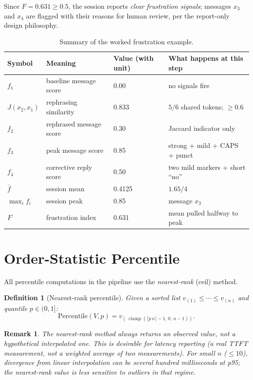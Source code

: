 \documentclass[11pt,a4paper]{article}
\newtheorem{definition}{Definition}
\newtheorem{remark}{Remark}
\newcommand{\clamp}[3]{\operatorname{clamp}\!\left(#1,\,#2,\,#3\right)}
\begin{document}
Since $F = 0.631 \geq 0.5$, the session reports \emph{clear frustration
signals}; messages $x_3$ and $x_4$ are flagged with their reasons for
human review, per the report-only design philosophy.

\begin{table}[h!]
\centering
\caption{Summary of the worked frustration example.}
\label{tab:frustration-worked}
\begin{tabular}{@{}llll@{}}
\toprule
Symbol & Meaning & Value (with unit) & What happens at this step \\
\midrule
$f_1$ & baseline message score & 0.00 & no signals fire \\
$J(x_2, x_1)$ & rephrasing similarity & 0.833 & $5/6$ shared tokens; $\geq 0.6$ \\
$f_2$ & rephrased message score & 0.30 & Jaccard indicator only \\
$f_3$ & peak message score & 0.85 & strong + mild + CAPS + punct \\
$f_4$ & corrective reply score & 0.50 & two mild markers + short ``no'' \\
$\bar{f}$ & session mean & 0.4125 & $1.65 / 4$ \\
$\max_i f_i$ & session peak & 0.85 & message $x_3$ \\
$F$ & frustration index & 0.631 & mean pulled halfway to peak \\
\bottomrule
\end{tabular}
\end{table}

\section{Order-Statistic Percentile}
\label{sec:percentile}

All percentile computations in the pipeline use the \emph{nearest-rank}
(ceil) method.

\begin{definition}[Nearest-rank percentile]
Given a sorted list $v_{(1)} \leq \cdots \leq v_{(n)}$ and quantile
$p \in (0, 1]$:
\[
  \text{Percentile}(V, p) = v_{\!\left(\,\clamp{\lceil p\,n \rceil - 1}{0}{n-1}\right)}.
\]
\end{definition}

\begin{remark}
The nearest-rank method always returns an \emph{observed} value, not a
hypothetical interpolated one.  This is desirable for latency reporting
(a real TTFT measurement, not a weighted average of two measurements).
For small $n$ ($\leq 10$), divergence from linear interpolation can be
several hundred milliseconds at p95; the nearest-rank value is less
sensitive to outliers in that regime.
\end{remark}
\end{document}
